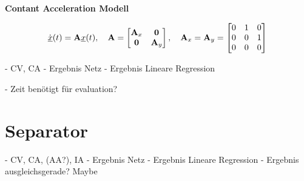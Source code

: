 \textbf{Contant Acceleration Modell}

\begin{align*} \label{eq:speedCV}
    \dot{{\underline{x}}}(t) = {{\mathbf{A}}}{\underline{x}}(t), \quad {\ensuremath{{\mathbf{A}}}} = 
    \begin{bmatrix}
        {\ensuremath{{\mathbf{A}}}}_x & \boldsymbol{0} \\
        \boldsymbol{0} & {{\mathbf{A}}}_y
    \end{bmatrix} 
    , \quad
    {\ensuremath{{\mathbf{A}}}}_x = {{\mathbf{A}}}_y = 
    \begin{bmatrix}
        0 & 1 & 0 \\
        0 & 0 & 1 \\
        0 & 0 & 0
    \end{bmatrix} 
\end{align*}


- CV, CA
- Ergebnis Netz
- Ergebnis Lineare Regression

- Zeit benötigt für evaluation?

\section{Separator}

- CV, CA, (AA?), IA
- Ergebnis Netz
- Ergebnis Lineare Regression
- Ergebnis ausgleichsgerade? Maybe